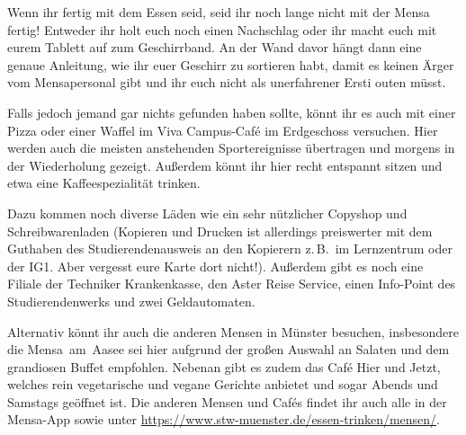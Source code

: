 \begin{multicols}{2}
Wenn ihr fertig mit dem Essen seid, seid ihr noch lange nicht mit der Mensa fertig!
Entweder ihr holt euch noch einen Nachschlag oder ihr macht euch mit eurem Tablett auf zum Geschirrband.
An der Wand davor hängt dann eine genaue Anleitung, wie ihr euer Geschirr zu sortieren habt, damit es keinen Ärger vom Mensapersonal gibt und ihr euch nicht als unerfahrener Ersti outen müsst.


Falls jedoch jemand gar nichts gefunden haben sollte, könnt ihr es auch mit einer Pizza oder einer Waffel im Viva Campus-Café im Erdgeschoss versuchen.
Hier werden auch die meisten anstehenden Sportereignisse übertragen und morgens in der Wiederholung gezeigt.
Außerdem könnt ihr hier recht entspannt sitzen und etwa eine Kaffeespezialität trinken.

Dazu kommen noch diverse Läden wie ein sehr nützlicher Copyshop und Schreibwarenladen (Kopieren und Drucken ist allerdings preiswerter mit dem Guthaben des Studierendenausweis an den Kopierern z.\,B.\ im Lernzentrum oder der IG1. Aber vergesst eure Karte dort nicht!).
Außerdem gibt es noch eine Filiale der Techniker Krankenkasse, den Aster Reise Service, einen Info-Point des Studierendenwerks und zwei Geldautomaten.

Alternativ könnt ihr auch die anderen Mensen in Münster besuchen, insbesondere die Mensa~am~Aasee sei hier aufgrund der großen Auswahl an Salaten und dem grandiosen Buffet empfohlen.
Nebenan gibt es zudem das Café Hier und Jetzt, welches rein vegetarische und vegane Gerichte anbietet und sogar Abends und Samstags geöffnet ist.
Die anderen Mensen und Cafés findet ihr auch alle in der Mensa-App sowie unter \url{https://www.stw-muenster.de/essen-trinken/mensen/}.

\end{multicols}

